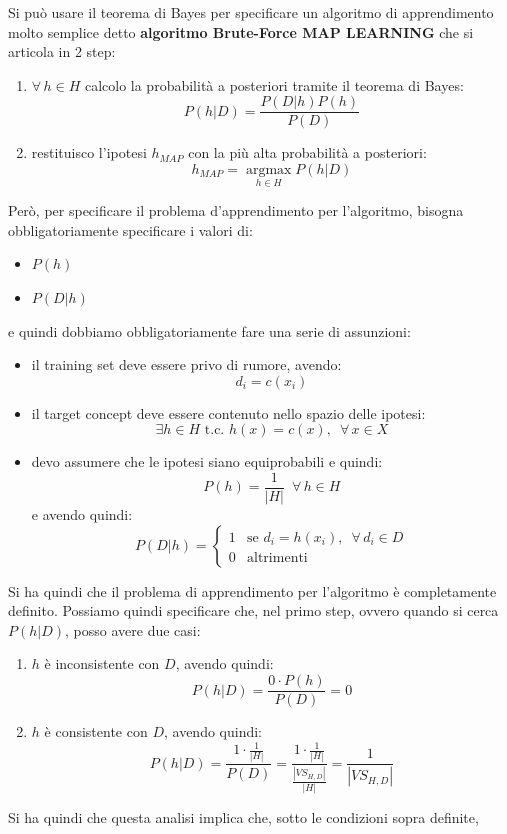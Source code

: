 \documentclass[a4paper,12pt, oneside]{book}
\begin{document}
Si può usare il teorema di Bayes per specificare un algoritmo di apprendimento
molto semplice detto \textbf{algoritmo Brute-Force MAP LEARNING} che si articola
in 2 step:
\begin{enumerate}
  \item $\forall\,h\in H$ calcolo la probabilità a posteriori tramite il teorema
  di Bayes:
  \[P(h|D)=\frac{P(D|h)P(h)}{P(D)}\]
  
  \item restituisco l'ipotesi $h_{MAP}$ con la più alta probabilità a
  posteriori:
  \[h_{MAP}=\operatorname*{argmax}_{h\in H}P(h|D)\]
\end{enumerate}
Però, per specificare il problema d'apprendimento per l'algoritmo, bisogna
obbligatoriamente specificare i valori di:
\begin{itemize}
  \item $P(h)$
  \item $P(D|h)$
\end{itemize}
e quindi dobbiamo obbligatoriamente fare una serie di assunzioni:
\begin{itemize}
  \item il training set deve essere privo di rumore, avendo:
  \[d_i=c(x_i)\]
  \item il target concept deve essere contenuto nello spazio delle ipotesi:
  \[\exists h\in H \mbox{ t.c. }h(x)=c(x),\,\,\,\forall\, x\in X\]
  \item devo assumere che le ipotesi siano equiprobabili e quindi:
  \[P(h)=\frac{1}{|H|}\,\,\,\forall\,h\in H\]
  e avendo quindi:
  \[P(D|h)=
    \begin{cases}
      1&\mbox{se } d_i=h(x_i),\,\,\,\forall\,d_i\in D\\
      0&\mbox{altrimenti}
    \end{cases}
  \]
\end{itemize}
Si ha quindi che il problema di apprendimento per l'algoritmo è completamente
definito. Possiamo quindi specificare che, nel primo step, ovvero quando si
cerca $P(h|D)$, posso avere due casi:
\begin{enumerate}
  \item $h$ è inconsistente con $D$, avendo quindi:
  \[P(h|D)=\frac{0\cdot P(h)}{P(D)}=0\]
  \item $h$ è consistente con $D$, avendo quindi:
  \[P(h|D)=\frac{1\cdot \frac{1}{|H|}}{P(D)}=\frac{1\cdot
      \frac{1}{|H|}}{\frac{|VS_{H,D}|}{|H|}}=\frac{1}{|VS_{H,D}|}\] 
\end{enumerate}
Si ha quindi che questa analisi implica che, sotto le condizioni sopra definite,
\end{document}
